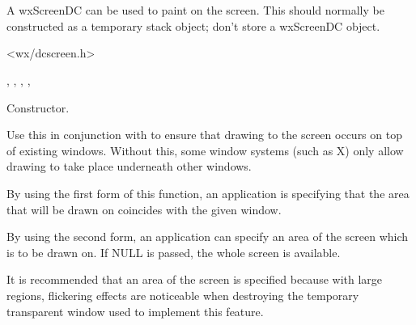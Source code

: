 \section{}\label{wxscreendc}

A wxScreenDC can be used to paint on the screen.
This should normally be constructed as a temporary stack object; don't store
a wxScreenDC object.




<wx/dcscreen.h>




, , ,\rtfsp
{}, 


\label{wxscreendcctor}


Constructor.

\label{wxscreendcstartdrawingontop}



Use this in conjunction with  to
ensure that drawing to the screen occurs on top of existing windows. Without this,
some window systems (such as X) only allow drawing to take place underneath
other windows.

By using the first form of this function, an application is specifying that
the area that will be drawn on coincides with the given window.

By using the second form, an application can specify an area of the screen
which is to be drawn on. If NULL is passed, the whole screen is available.

It is recommended that an area of the screen is specified because with large regions,
flickering effects are noticeable when destroying the temporary transparent window used
to implement this feature.

